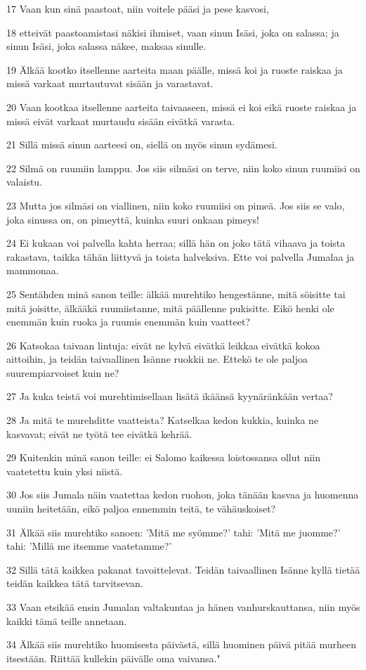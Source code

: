 \par 17 Vaan kun sinä paastoat, niin voitele pääsi ja pese kasvosi,
\par 18 etteivät paastoamistasi näkisi ihmiset, vaan sinun Isäsi, joka on salassa; ja sinun Isäsi, joka salassa näkee, maksaa sinulle.
\par 19 Älkää kootko itsellenne aarteita maan päälle, missä koi ja ruoste raiskaa ja missä varkaat murtautuvat sisään ja varastavat.
\par 20 Vaan kootkaa itsellenne aarteita taivaaseen, missä ei koi eikä ruoste raiskaa ja missä eivät varkaat murtaudu sisään eivätkä varasta.
\par 21 Sillä missä sinun aarteesi on, siellä on myös sinun sydämesi.
\par 22 Silmä on ruumiin lamppu. Jos siis silmäsi on terve, niin koko sinun ruumiisi on valaistu.
\par 23 Mutta jos silmäsi on viallinen, niin koko ruumiisi on pimeä. Jos siis se valo, joka sinussa on, on pimeyttä, kuinka suuri onkaan pimeys!
\par 24 Ei kukaan voi palvella kahta herraa; sillä hän on joko tätä vihaava ja toista rakastava, taikka tähän liittyvä ja toista halveksiva. Ette voi palvella Jumalaa ja mammonaa.
\par 25 Sentähden minä sanon teille: älkää murehtiko hengestänne, mitä söisitte tai mitä joisitte, älkääkä ruumiistanne, mitä päällenne pukisitte. Eikö henki ole enemmän kuin ruoka ja ruumis enemmän kuin vaatteet?
\par 26 Katsokaa taivaan lintuja: eivät ne kylvä eivätkä leikkaa eivätkä kokoa aittoihin, ja teidän taivaallinen Isänne ruokkii ne. Ettekö te ole paljoa suurempiarvoiset kuin ne?
\par 27 Ja kuka teistä voi murehtimisellaan lisätä ikäänsä kyynäränkään vertaa?
\par 28 Ja mitä te murehditte vaatteista? Katselkaa kedon kukkia, kuinka ne kasvavat; eivät ne työtä tee eivätkä kehrää.
\par 29 Kuitenkin minä sanon teille: ei Salomo kaikessa loistossansa ollut niin vaatetettu kuin yksi niistä.
\par 30 Jos siis Jumala näin vaatettaa kedon ruohon, joka tänään kasvaa ja huomenna uuniin heitetään, eikö paljoa ennemmin teitä, te vähäuskoiset?
\par 31 Älkää siis murehtiko sanoen: 'Mitä me syömme?' tahi: 'Mitä me juomme?' tahi: 'Millä me itsemme vaatetamme?'
\par 32 Sillä tätä kaikkea pakanat tavoittelevat. Teidän taivaallinen Isänne kyllä tietää teidän kaikkea tätä tarvitsevan.
\par 33 Vaan etsikää ensin Jumalan valtakuntaa ja hänen vanhurskauttansa, niin myös kaikki tämä teille annetaan.
\par 34 Älkää siis murehtiko huomisesta päivästä, sillä huominen päivä pitää murheen itsestään. Riittää kullekin päivälle oma vaivansa."

